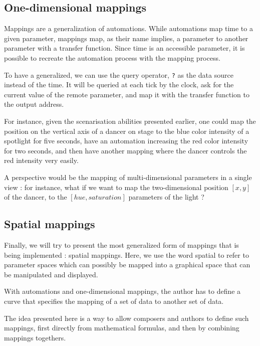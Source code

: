 \documentclass{sigchi}
\begin{document}
\subsection{One-dimensional mappings}
Mappings are a generalization of automations. While automations map time to a given parameter, mappings map, as their name implies, a parameter to another parameter with a transfer function. Since time is an accessible parameter, it is possible to recreate the automation process with the mapping process.

To have a generalized, we can use the query operator, \texttt{?} as the data source instead of the time. It will be queried at each tick by the clock, ask for the current value of the remote parameter, and map it with the transfer function to the output address.

For instance, given the scenarisation abilities presented earlier, one could map the position on the vertical axis of a dancer on stage to the blue color intensity of a spotlight for five seconds, have an automation increasing the red color intensity for  two seconds, and then have another mapping where the dancer controls the red intensity very easily.

A perspective would be the mapping of multi-dimensional parameters in a single view : for instance, what if we want to map the two-dimensional position $[x, y]$ of the dancer, to the $[hue, saturation]$ parameters of the light ?

\subsection{Spatial mappings}
Finally, we will try to present the most generalized form of mappings that is being implemented : spatial mappings. Here, we use the word spatial to refer to parameter spaces which can possibly be mapped into a graphical space that can be manipulated and displayed. 

With automations and one-dimensional mappings, the author has to define a curve that specifies the mapping of a set of data to another set of data.

The idea presented here is a way to allow composers and authors to define such mappings, first directly from mathematical formulas, and then by combining mappings togethers.
\end{document}
